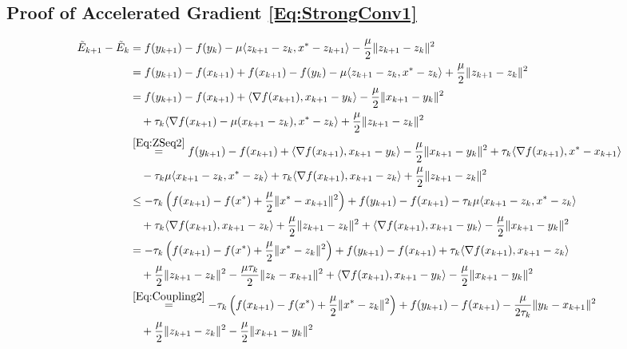 \documentclass[11pt]{article}
\theoremstyle{plain}
\begin{document}
\subsection{Proof of Accelerated Gradient \eqref{Eq:StrongConv1}}
\begin{align*}
\tilde E_{k+1} - \tilde E_k &= f(y_{k+1}) - f(y_k) - \mu \langle z_{k+1} - z_k, x^\ast - z_{k+1}\rangle - \frac{\mu}{2}\|z_{k+1} - z_k\|^2\\
&= f(y_{k+1}) - f(x_{k+1}) + f(x_{k+1}) - f(y_k) - \mu \langle z_{k+1} - z_k, x^\ast - z_{k}\rangle + \frac{\mu}{2}\|z_{k+1} - z_k\|^2\\
&= f(y_{k+1})- f(x_{k+1}) + \langle \nabla f(x_{k+1}), x_{k+1} - y_k\rangle - \frac{\mu}{2}\|x_{k+1} - y_k\|^2 \\
&\quad + \tau_k \langle \nabla f(x_{k+1}) - \mu(x_{k+1} - z_k), x^\ast - z_{k}\rangle + \frac{\mu}{2}\|z_{k+1} - z_k\|^2\\
&\overset{\eqref{Eq:ZSeq2}}{=} f(y_{k+1}) - f(x_{k+1}) + \langle \nabla f(x_{k+1}), x_{k+1} - y_k\rangle - \frac{\mu}{2}\|x_{k+1} - y_k\|^2  + \tau_k \langle \nabla f(x_{k+1}), x^\ast - x_{k+1} \rangle \\
&\quad - \tau_k\mu\langle x_{k+1} - z_k, x^\ast - z_{k}\rangle +\tau_k \langle\nabla f(x_{k+1}), x_{k+1} - z_{k}\rangle  + \frac{\mu}{2}\|z_{k+1} - z_k\|^2\\
%
&\leq -\tau_k\left( f(x_{k+1} ) - f(x^\ast) + \frac{\mu}{2}\|x^\ast - x_{k+1}\|^2 \right) + f(y_{k+1}) - f(x_{k+1})   - \tau_k\mu\langle x_{k+1} - z_k, x^\ast - z_{k}\rangle\\
&\quad +\tau_k \langle\nabla f(x_{k+1}), x_{k+1} - z_{k}\rangle  + \frac{\mu}{2}\|z_{k+1} - z_k\|^2 + \langle \nabla f(x_{k+1}), x_{k+1} - y_k\rangle - \frac{\mu}{2}\|x_{k+1} - y_k\|^2\\
&= -\tau_k\left( f(x_{k+1} ) - f(x^\ast) + \frac{\mu}{2}\|x^\ast - z_k\|^2 \right) + f(y_{k+1}) - f(x_{k+1})  +\tau_k \langle\nabla f(x_{k+1}), x_{k+1} - z_{k}\rangle\\
&\quad   + \frac{\mu}{2}\|z_{k+1} - z_k\|^2 - \frac{\mu\tau_k}{2}\|z_k - x_{k+1}\|^2 + \langle \nabla f(x_{k+1}), x_{k+1} - y_k\rangle - \frac{\mu}{2} \|x_{k+1} - y_{k}\|^2 \\
&\overset{\eqref{Eq:Coupling2}}{=} -\tau_k\left( f(x_{k+1} ) - f(x^\ast) + \frac{\mu}{2}\|x^\ast - z_k\|^2 \right) + f(y_{k+1}) - f(x_{k+1}) - \frac{\mu}{2\tau_k}\|y_k - x_{k+1}\|^2  \\
&\quad   + \frac{\mu}{2}\|z_{k+1} - z_k\|^2  - \frac{\mu}{2} \|x_{k+1} - y_{k}\|^2\\\

\end{align*}
\end{document}
